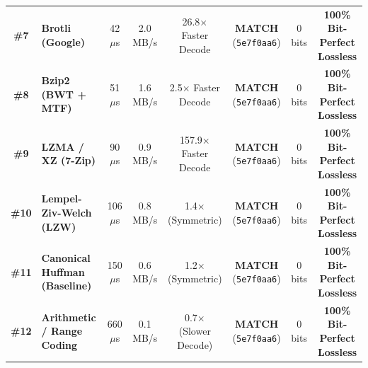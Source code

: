 \documentclass{ieeeaccess}
\begin{document}
\begin{table}[t]
\begin{tabularx}{\textwidth}{c l c c c c c c}
\textbf{\#7} & \textbf{Brotli (Google)} & 42 $\mu$s & 2.0 MB/s & 26.8$\times$ Faster Decode & \textbf{MATCH} (\texttt{5e7f0aa6}) & 0 bits & \textbf{100\% Bit-Perfect Lossless} \\
\textbf{\#8} & \textbf{Bzip2 (BWT + MTF)} & 51 $\mu$s & 1.6 MB/s & 2.5$\times$ Faster Decode & \textbf{MATCH} (\texttt{5e7f0aa6}) & 0 bits & \textbf{100\% Bit-Perfect Lossless} \\
\textbf{\#9} & \textbf{LZMA / XZ (7-Zip)} & 90 $\mu$s & 0.9 MB/s & 157.9$\times$ Faster Decode & \textbf{MATCH} (\texttt{5e7f0aa6}) & 0 bits & \textbf{100\% Bit-Perfect Lossless} \\
\textbf{\#10} & \textbf{Lempel-Ziv-Welch (LZW)} & 106 $\mu$s & 0.8 MB/s & 1.4$\times$ (Symmetric) & \textbf{MATCH} (\texttt{5e7f0aa6}) & 0 bits & \textbf{100\% Bit-Perfect Lossless} \\
\textbf{\#11} & \textbf{Canonical Huffman (Baseline)} & 150 $\mu$s & 0.6 MB/s & 1.2$\times$ (Symmetric) & \textbf{MATCH} (\texttt{5e7f0aa6}) & 0 bits & \textbf{100\% Bit-Perfect Lossless} \\
\textbf{\#12} & \textbf{Arithmetic / Range Coding} & 660 $\mu$s & 0.1 MB/s & 0.7$\times$ (Slower Decode) & \textbf{MATCH} (\texttt{5e7f0aa6}) & 0 bits & \textbf{100\% Bit-Perfect Lossless} \\
\bottomrule
\end{tabularx}
\end{table}
\end{document}
